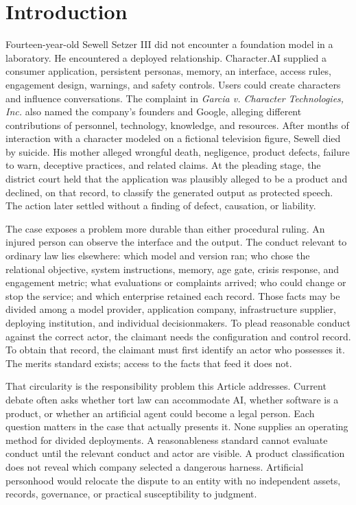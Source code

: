 \section*{Introduction}
\label{sec:introduction}

Fourteen-year-old Sewell Setzer III did not encounter a foundation model in a laboratory. He encountered a deployed relationship. Character.AI supplied a consumer application, persistent personas, memory, an interface, access rules, engagement design, warnings, and safety controls. Users could create characters and influence conversations. The complaint in \emph{Garcia v. Character Technologies, Inc.} also named the company's founders and Google, alleging different contributions of personnel, technology, knowledge, and resources. After months of interaction with a character modeled on a fictional television figure, Sewell died by suicide. His mother alleged wrongful death, negligence, product defects, failure to warn, deceptive practices, and related claims. At the pleading stage, the district court held that the application was plausibly alleged to be a product and declined, on that record, to classify the generated output as protected speech. The action later settled without a finding of defect, causation, or liability.

The case exposes a problem more durable than either procedural ruling. An injured person can observe the interface and the output. The conduct relevant to ordinary law lies elsewhere: which model and version ran; who chose the relational objective, system instructions, memory, age gate, crisis response, and engagement metric; what evaluations or complaints arrived; who could change or stop the service; and which enterprise retained each record. Those facts may be divided among a model provider, application company, infrastructure supplier, deploying institution, and individual decisionmakers. To plead reasonable conduct against the correct actor, the claimant needs the configuration and control record. To obtain that record, the claimant must first identify an actor who possesses it. The merits standard exists; access to the facts that feed it does not.

That circularity is the responsibility problem this Article addresses. Current debate often asks whether tort law can accommodate AI, whether software is a product, or whether an artificial agent could become a legal person. Each question matters in the case that actually presents it. None supplies an operating method for divided deployments. A reasonableness standard cannot evaluate conduct until the relevant conduct and actor are visible. A product classification does not reveal which company selected a dangerous harness. Artificial personhood would relocate the dispute to an entity with no independent assets, records, governance, or practical susceptibility to judgment.

